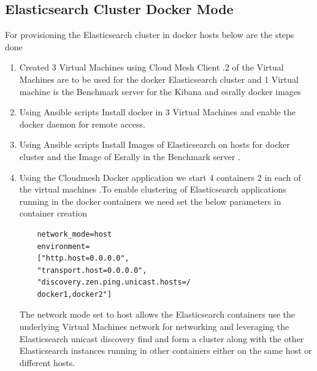 \documentclass[9pt,twocolumn,twoside]{../../styles/osajnl}
\begin{document}
 \subsection{Elasticsearch Cluster Docker Mode}
  For provisioning the Elasticsearch cluster in docker hosts below are the steps done
\begin{enumerate}
\item Created 3 Virtual Machines using Cloud Mesh Client .2 of the Virtual Machines  are to be used for the docker Elasticsearch cluster and 1 Virtual machine is the Benchmark server for the Kibana and esrally docker images 
\item Using Ansible scripts Install docker in 3 Virtual Machines and enable the docker daemon for remote access.
\item Using Ansible scripts Install Images of Elasticsearch  on hosts for docker cluster and the Image of Esrally in the Benchmark server .
\item Using the Cloudmesh Docker application we start 4 containers 2 in each of the virtual machines .To enable clustering of Elasticsearch applications running in the docker containers we need set the below parameters in container creation
\begin{verbatim}
    network_mode=host 
    environment=
    ["http.host=0.0.0.0",
    "transport.host=0.0.0.0",
    "discovery.zen.ping.unicast.hosts=/
    docker1,docker2"]
\end{verbatim}

The network mode set to host allows the Elasticsearch containers use the underlying Virtual Machines  network for networking and leveraging the Elasticsearch unicast discovery find and form a cluster along with the other Elasticsearch instances running in other
containers either on the same host or different hosts.

\end{enumerate}
\end{document}
